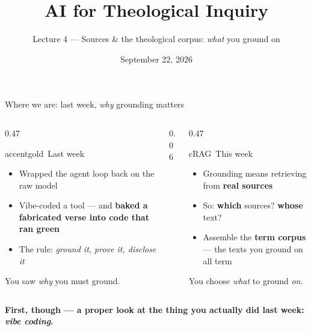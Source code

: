 


\title{AI for Theological Inquiry}
\subtitle{Lecture 4 --- Sources \& the theological corpus: \emph{what} you ground on}
\date{September 22, 2026}





\begin{frame}{Where we are: last week, \emph{why} grounding matters}
  \begin{columns}[c, totalwidth=\textwidth]
    \begin{column}{0.47\textwidth}
      \begin{featbox}{accentgold}{\faGhost\ Last week}
        \small
        \begin{itemize}
          \item Wrapped the agent loop back on the raw model
          \item Vibe-coded a tool --- and \textbf{baked a fabricated verse into code that ran green}
          \item The rule: \emph{ground it, prove it, disclose it}
        \end{itemize}
        {\scriptsize\color{midgray}You saw \emph{why} you must ground.}
      \end{featbox}
    \end{column}
    \begin{column}{0.06\textwidth}\end{column}
    \begin{column}{0.47\textwidth}
      \begin{featbox}{cRAG}{\faLayerGroup\ This week}
        \small
        \begin{itemize}
          \item Grounding means retrieving from \textbf{real sources}
          \item So: \textbf{which} sources? \textbf{whose} text?
          \item Assemble the \textbf{term corpus} --- the texts you ground on all term
        \end{itemize}
        {\scriptsize\color{midgray}You choose \emph{what} to ground \emph{on}.}
      \end{featbox}
    \end{column}
  \end{columns}
  \vspace{10pt}
  \begin{center}\small\color{labnavy}\bfseries
    First, though --- a proper look at the thing you actually did last week: \emph{vibe coding}.\end{center}
\end{frame}

